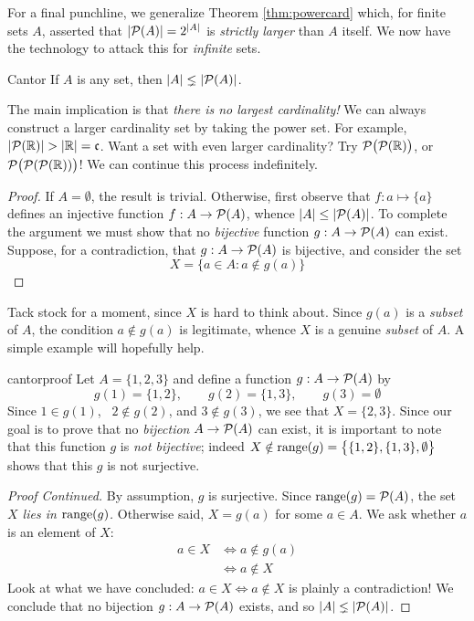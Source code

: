 For a final punchline, we generalize Theorem \ref{thm:powercard} which, for finite sets $A$, asserted that $\left| \mathcal{P}(A)\right|=2^{\left| A\right|}$ is \emph{strictly larger} than $A$ itself. We now have the technology to attack this for \emph{infinite} sets.

\begin{thm}{Cantor}{}
	If $A$ is any set, then $\left| A\right|\lneq\left| \mathcal{P}(A)\right|$.
\end{thm}

The main implication is that \emph{there is no largest cardinality!} We can always construct a larger cardinality set by taking the power set. For example, $\nm{\cP(\R)}>\nm\R=\fc$. Want a set with even larger cardinality? Try $\mathcal{P}\bigl(\mathcal{P}(\mathbb{R})\bigr)$, or $\mathcal{P}\bigl(\mathcal{P}(\mathcal{P}(\mathbb{R}))\bigr)$! We can continue this process indefinitely.


\begin{proof}
	If $A=\emptyset$, the result is trivial. Otherwise, first observe that $f:a\mapsto\{a\}$ defines an injective function $f:A\to\mathcal{P}(A)$, whence $\left| A\right|\le\left| \mathcal{P}(A)\right|$.\smallbreak
	To complete the argument we must show that no \emph{bijective} function $g:A\to\mathcal{P}(A)$ can exist. Suppose, for a contradiction, that $g:A\to\mathcal{P}(A)$ is bijective, and consider the set 
	  \[
	  	X=\bigl\{a\in A:a\notin g(a)\bigr\} \tag*{\phantom\qedhere}
	  \]
\end{proof}

Tack stock for a moment, since $X$ is hard to think about. Since $g(a)$ is a \emph{subset} of $A$, the condition $a\not\in g(a)$ is legitimate, whence $X$ is a genuine \emph{subset} of $A$. A simple example will hopefully help.
  
\begin{example}{}{cantorproof}
	Let $A=\{1,2,3\}$ and define a function $g:A\to\mathcal{P}(A)$ by
  \[
  	g(1)=\{1,2\},\qquad g(2)=\{1,3\},\qquad g(3)=\emptyset
  \]
  Since $1\in g(1)$, \ $2\notin g(2)$, and $3\notin g(3)$, we see that $X=\{2,3\}$. Since our goal is to prove that no \emph{bijection} $A\to\mathcal{P}(A)$ can exist, it is important to note that this function $g$ is \emph{not bijective}; indeed $X\notin\operatorname{range}(g)=\bigl\{\{1,2\},\{1,3\},\emptyset\bigr\}$ shows that this $g$ is not surjective.
\end{example}

\begin{proof}[Proof Continued]  
	By assumption, $g$ is surjective. Since $\operatorname{range}(g)=\mathcal{P}(A)$, the set \emph{$X$ lies in $\operatorname{range}(g)$.} Otherwise said, $X=g(a)$ for some $a\in A$. We ask whether $a$ is an element of $X$:
	\begin{align*}
		a\in X&\iff a\notin g(a)\tag{definition of $X$}\\
		&\iff a\notin X\tag{since $X=g(a)$}
	\end{align*}
	Look at what we have concluded: $a\in X\iff a\notin X$ is plainly a contradiction! We conclude that no bijection $g:A\to\mathcal{P}(A)$ exists, and so $\left| A\right|\lneq\left| \mathcal{P}(A)\right|$.
\end{proof}

